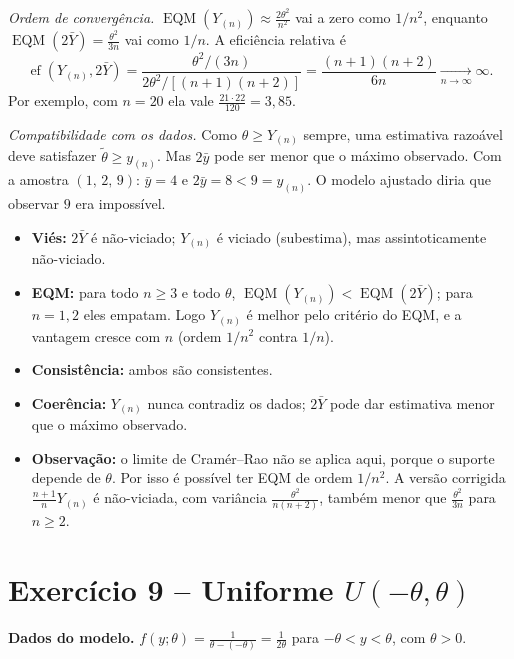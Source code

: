 \documentclass[11pt,a4paper]{article}
\newcommand{\EQM}{\operatorname{EQM}}
\newcommand{\bY}{\bar{Y}}
\begin{document}
\textit{Ordem de convergência.} $\EQM(Y_{(n)})\approx\frac{2\theta^2}{n^2}$ vai a zero como $1/n^2$, enquanto $\EQM(2\bY)=\frac{\theta^2}{3n}$ vai como $1/n$. A eficiência relativa é
\[
\operatorname{ef}(Y_{(n)},2\bY)=\frac{\theta^2/(3n)}{2\theta^2/[(n+1)(n+2)]}=\frac{(n+1)(n+2)}{6n}\xrightarrow[n\to\infty]{}\infty .
\]
Por exemplo, com $n=20$ ela vale $\frac{21\cdot22}{120}=3{,}85$.

\textit{Compatibilidade com os dados.} Como $\theta\ge Y_{(n)}$ sempre, uma estimativa razoável deve satisfazer $\tilde\theta\ge y_{(n)}$. Mas $2\bar y$ pode ser menor que o máximo observado. Com a amostra $(1,\,2,\,9)$: $\bar y=4$ e $2\bar y=8<9=y_{(n)}$. O modelo ajustado diria que observar $9$ era impossível.

\begin{resposta}
\begin{itemize}[leftmargin=1.2em]
\item \textbf{Viés:} $2\bY$ é não-viciado; $Y_{(n)}$ é viciado (subestima), mas assintoticamente não-viciado.
\item \textbf{EQM:} para todo $n\ge3$ e todo $\theta$, $\EQM(Y_{(n)})<\EQM(2\bY)$; para $n=1,2$ eles empatam. Logo $Y_{(n)}$ é melhor pelo critério do EQM, e a vantagem cresce com $n$ (ordem $1/n^2$ contra $1/n$).
\item \textbf{Consistência:} ambos são consistentes.
\item \textbf{Coerência:} $Y_{(n)}$ nunca contradiz os dados; $2\bY$ pode dar estimativa menor que o máximo observado.
\item \textbf{Observação:} o limite de Cramér--Rao não se aplica aqui, porque o suporte depende de $\theta$. Por isso é possível ter EQM de ordem $1/n^2$. A versão corrigida $\frac{n+1}{n}Y_{(n)}$ é não-viciada, com variância $\frac{\theta^2}{n(n+2)}$, também menor que $\frac{\theta^2}{3n}$ para $n\ge2$.
\end{itemize}
\end{resposta}

\section{Exercício 9 -- Uniforme $U(-\theta,\theta)$}

\textbf{Dados do modelo.} $f(y;\theta)=\frac{1}{\theta-(-\theta)}=\frac{1}{2\theta}$ para $-\theta<y<\theta$, com $\theta>0$.
\end{document}
